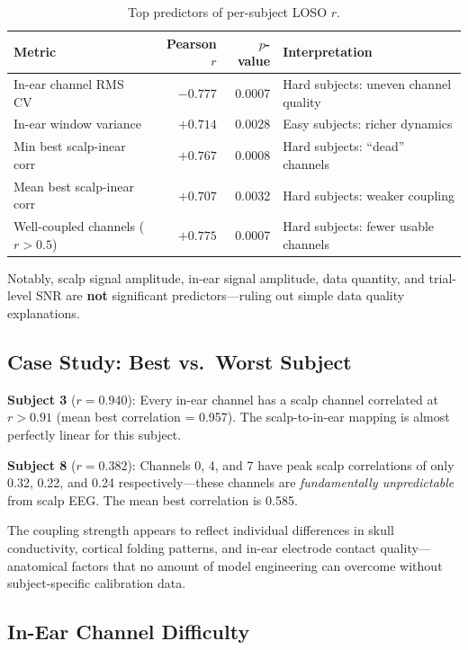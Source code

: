 \documentclass[11pt,a4paper]{article}
\begin{document}
\begin{table}[H]
\centering
\caption{Top predictors of per-subject LOSO $r$.}
\begin{tabular}{lrrl}
\toprule
Metric & Pearson $r$ & $p$-value & Interpretation \\
\midrule
In-ear channel RMS CV & $-0.777$ & 0.0007 & Hard subjects: uneven channel quality \\
In-ear window variance & $+0.714$ & 0.0028 & Easy subjects: richer dynamics \\
Min best scalp-inear corr & $+0.767$ & 0.0008 & Hard subjects: ``dead'' channels \\
Mean best scalp-inear corr & $+0.707$ & 0.0032 & Hard subjects: weaker coupling \\
Well-coupled channels ($r > 0.5$) & $+0.775$ & 0.0007 & Hard subjects: fewer usable channels \\
\bottomrule
\end{tabular}
\end{table}

Notably, scalp signal amplitude, in-ear signal amplitude, data quantity,
and trial-level SNR are \textbf{not} significant predictors---ruling out
simple data quality explanations.

\subsection{Case Study: Best vs.\ Worst Subject}

\textbf{Subject 3} ($r = 0.940$): Every in-ear channel has a scalp channel
correlated at $r > 0.91$ (mean best correlation = 0.957). The
scalp-to-in-ear mapping is almost perfectly linear for this subject.

\textbf{Subject 8} ($r = 0.382$): Channels 0, 4, and 7 have peak
scalp correlations of only 0.32, 0.22, and 0.24 respectively---these
channels are \emph{fundamentally unpredictable} from scalp EEG. The mean
best correlation is 0.585.

The coupling strength appears to reflect individual differences in skull
conductivity, cortical folding patterns, and in-ear electrode contact
quality---anatomical factors that no amount of model engineering can
overcome without subject-specific calibration data.

\subsection{In-Ear Channel Difficulty}
\end{document}
